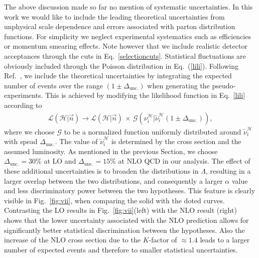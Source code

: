 \documentclass[preprint]{JHEP3}
\newcommand{\be}{\begin{eqnarray}}
\newcommand{\ee}{\end{eqnarray}}
\begin{document}
The above discussion made so far no mention of systematic uncertainties.
In this work we would like to include the leading theoretical uncertainties from unphysical scale dependence and errors associated with parton distribution functions.
For simplicity we neglect experimental systematics such as efficiencies or momentum smearing effects.
Note however that we include realistic detector acceptances through the cuts in Eq.~\ref{selectioncuts}.
Statistical fluctuations are obviously included through the Poisson distribution in Eq.~(\ref{lili}).
Following Ref.~\cite{Conway}, we include the theoretical uncertainties 
by integrating the expected number of events over the range $(1 \pm \Delta_\mathrm{unc.})$ 
when generating the pseudo-experiments.
This is achieved by modifying the likelihood function in Eq.~\ref{lili} according to
\be
  \mathcal{L}(\mathcal{H}|\vec{n}) \to \mathcal{L}(\mathcal{H}|\vec{n})  \,\times\, \mathcal{G} \left( \nu_i^\mathcal{H} | \tilde{\nu}_i^\mathcal{H}  (1 \pm \Delta_\mathrm{unc.}) \right),
\ee
where we choose $\mathcal{G}$ to be a normalized function uniformly distributed around $\tilde{\nu}_i^\mathcal{H}$ with spead $\Delta_\mathrm{unc.}$.
The value of $\tilde{\nu}_i^\mathcal{H}$ is determined by the cross section and the assumed luminosity.
As mentioned in the previous Section, we choose $\Delta_\mathrm{unc.} = 30\%$ at LO
and $\Delta_\mathrm{unc.} = 15\%$ at NLO QCD in our analysis.
The effect of these additional uncertainties is to broaden the distributions in $\Lambda$, 
resulting in a larger overlap between the two distributions, and consequently a larger $\alpha$ value and less discriminatory power between the two hypotheses. 
This feature is clearly visible in Fig.~\ref{fig:vii}, when comparing the solid with the doted curves. 
Contrasting the LO results in Fig.~\ref{fig:vii}(left) with the NLO result (right) shows that 
the lower uncertainty associated with the NLO prediction allows for significantly better statistical discrimination between the hypotheses.
Also the increase of the NLO cross section due to the $K$-factor of $\approx1.4$ leads to a larger number of expected events and therefore to smaller statistical uncertainties.
\end{document}
